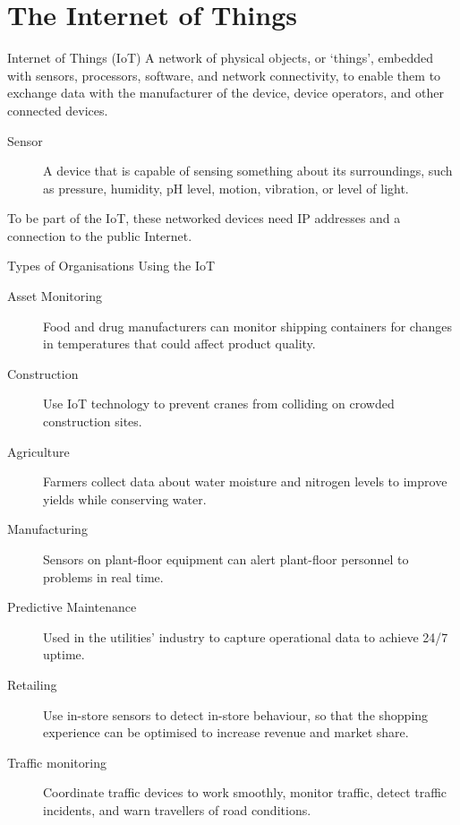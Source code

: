 \documentclass[\main/notes.tex]{subfiles}
\begin{document}
		\pagebreak
		\section{The Internet of Things}
			\begin{definition}{Internet of Things (IoT)}
				A network of physical objects, or `things', embedded with sensors, processors, software, and network connectivity, to enable them to exchange data with the manufacturer of the device, device operators, and other connected devices.
				\begin{description}
					\item[Sensor] A device that is capable of sensing something about its surroundings, such as pressure, humidity, pH level, motion, vibration, or level of light.
				\end{description}
				To be part of the IoT, these networked devices need IP addresses and a connection to the public Internet.
			\end{definition}
			\begin{sidenote}{Types of Organisations Using the IoT}
				\begin{description}
					\item[Asset Monitoring] Food and drug manufacturers can monitor shipping containers for changes in temperatures that could affect product quality.
					\item[Construction] Use IoT technology to prevent cranes from colliding on crowded construction sites.
					\item[Agriculture] Farmers collect data about water moisture and nitrogen levels to improve yields while conserving water.
					\item[Manufacturing] Sensors on plant-floor equipment can alert plant-floor personnel to problems in real time.
					\item[Predictive Maintenance] Used in the utilities' industry to capture operational data to achieve 24/7 uptime.
					\item[Retailing] Use in-store sensors to detect in-store behaviour, so that the shopping experience can be optimised to increase revenue and market share.
					\item[Traffic monitoring] Coordinate traffic devices to work smoothly, monitor traffic, detect traffic incidents, and warn travellers of road conditions.
				\end{description}
			\end{sidenote}

		\pagebreak
\end{document}
